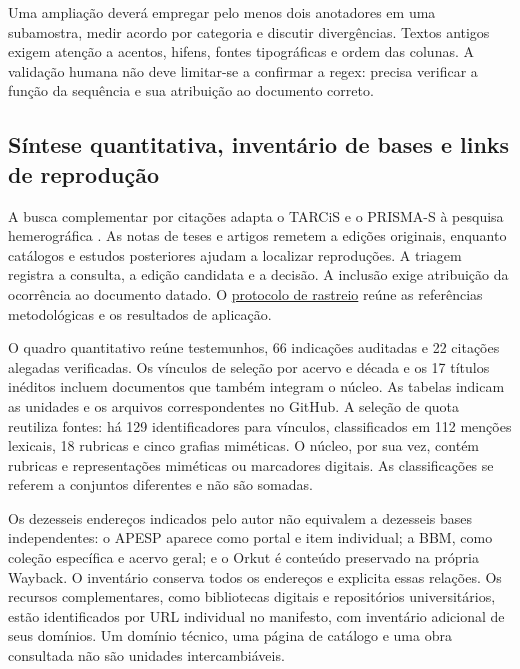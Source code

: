 Uma ampliação deverá empregar pelo menos dois anotadores em uma subamostra, medir acordo por categoria e discutir divergências. Textos antigos exigem atenção a acentos, hifens, fontes tipográficas e ordem das colunas. A validação humana não deve limitar-se a confirmar a regex: precisa verificar a função da sequência e sua atribuição ao documento correto.

\subsection{Síntese quantitativa, inventário de bases e links de reprodução}
A busca complementar por citações adapta o TARCiS e o PRISMA-S à pesquisa hemerográfica \cite{hirt2024tarcis,rethlefsen2021prismas}. As notas de teses e artigos remetem a edições originais, enquanto catálogos e estudos posteriores ajudam a localizar reproduções. A triagem registra a consulta, a edição candidata e a decisão. A inclusão exige atribuição da ocorrência ao documento datado. O \href{https://github.com/murilloed/historia-riso-escrito-portugues/blob/main/docs/RASTREIO.md}{protocolo de rastreio} reúne as referências metodológicas e os resultados de aplicação.

O quadro quantitativo reúne \CorpusSize{} testemunhos, 66 indicações auditadas e 22 citações alegadas verificadas. Os \ArchiveLinkCount{} vínculos de seleção por acervo e década e os 17 títulos inéditos incluem documentos que também integram o núcleo. As tabelas indicam as unidades e os arquivos correspondentes no GitHub. A seleção de quota reutiliza fontes: há 129 identificadores para \ArchiveLinkCount{} vínculos, classificados em 112 menções lexicais, 18 rubricas e cinco grafias miméticas. O núcleo, por sua vez, contém \CoreRubrics{} rubricas e \CoreMimetic{} representações miméticas ou marcadores digitais. As classificações se referem a conjuntos diferentes e não são somadas.

Os dezesseis endereços indicados pelo autor não equivalem a dezesseis bases independentes: o APESP aparece como portal e item individual; a BBM, como coleção específica e acervo geral; e o Orkut é conteúdo preservado na própria Wayback. O inventário conserva todos os endereços e explicita essas relações. Os recursos complementares, como bibliotecas digitais e repositórios universitários, estão identificados por URL individual no manifesto, com inventário adicional de seus domínios. Um domínio técnico, uma página de catálogo e uma obra consultada não são unidades intercambiáveis.

